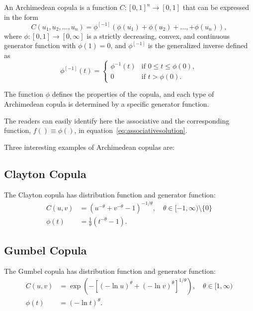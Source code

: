 \documentclass[
	11pt, %
	fleqn, %
	a4paper, %
]{LegrandOrangeBook}
\begin{document}
\begin{definition}
\label{def:archimedean}
An Archimedean copula is a function $C : [0,1]^n \to [0,1]$ that can be expressed in the form
\begin{equation}
C(u_1, u_2, \dots, u_n) = \phi^{[-1]}(\phi(u_1) + \phi(u_2) + \dots, + \phi(u_n)),
\label{eq:archimedeandef}
\end{equation}
where $\phi : [0,1] \to [0,\infty]$ is a strictly decreasing, convex, and continuous generator function with $\phi(1) = 0$, and $\phi^{[-1]}$ is the generalized inverse defined as
\begin{equation}
\phi^{[-1]}(t) = \begin{cases}
\phi^{-1}(t) & \text{if } 0 \leq t \leq \phi(0), \\
0 & \text{if } t > \phi(0).
\end{cases}
\label{eq:generalizedinverse}
\end{equation}
\end{definition}

The function $\phi$ defines the properties of the copula, and each type of Archimedean copula is determined by a specific generator function.

The readers can easily identify here the associative and the corresponding function, $f() \equiv \phi()$, in equation~\eqref{eq:associativesolution}.

Three interesting examples of Archimedean copulas are:

\subsection{Clayton Copula}
The Clayton copula has distribution function and generator function:
\begin{align}
C(u, v) &= (u^{-\theta} + v^{-\theta} - 1)^{-1/\theta}, \quad \theta \in [-1,\infty) \setminus \{0\} \\
\phi(t) &= \frac{1}{\theta}(t^{-\theta} - 1).
\end{align}

\subsection{Gumbel Copula}
The Gumbel copula has distribution function and generator function:
\begin{align}
C(u, v) &= \exp\left(-\left[(-\ln u)^\theta + (-\ln v)^\theta\right]^{1/\theta}\right), \quad \theta \in [1,\infty) \\
\phi(t) &= (-\ln t)^\theta.
\end{align}
\end{document}
